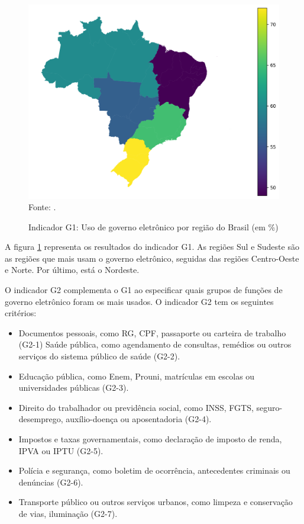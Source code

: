 \begin{figure}[H]
	\centering
	\caption{Indicador G1: Uso de governo eletrônico por região do Brasil (em \%)}
	\includegraphics[width=1\linewidth]{figuras/mapa_coropletico_tic_domicilios_2024_g1}
	\label{fig:mapa_coropletico_tic_domicilio_g1}
	\footnotesize{Fonte: \cite{tic_domicilios_2024_g1}.}
\end{figure}

A figura \ref{fig:mapa_coropletico_tic_domicilio_g1} representa os resultados do indicador G1. As regiões Sul e Sudeste são as regiões que mais usam o governo eletrônico, seguidas das regiões Centro-Oeste e Norte. Por último, está o Nordeste.

O indicador G2 complementa o G1 ao especificar quais grupos de funções de governo eletrônico foram os mais usados. O indicador G2 tem os seguintes critérios:

\begin{itemize}
	\item Documentos pessoais, como RG, CPF, passaporte ou carteira de trabalho (G2-1)
	Saúde pública, como agendamento de consultas, remédios ou outros serviços do sistema público de saúde (G2-2).
	\item Educação pública, como Enem, Prouni, matrículas em escolas ou universidades públicas (G2-3).
	\item Direito do trabalhador ou previdência social, como INSS, FGTS, seguro-desemprego, auxílio-doença ou aposentadoria (G2-4).
	\item Impostos e taxas governamentais, como declaração de imposto de renda, IPVA ou IPTU (G2-5).
	\item Polícia e segurança, como boletim de ocorrência, antecedentes criminais ou denúncias (G2-6).
	\item Transporte público ou outros serviços urbanos, como limpeza e conservação de vias, iluminação (G2-7).
\end{itemize}

